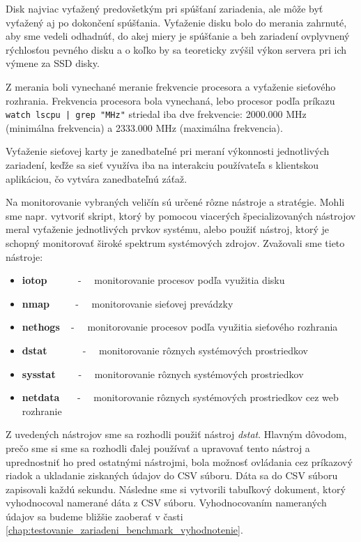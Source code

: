 Disk najviac vyťažený predovšetkým pri spúšťaní zariadenia, ale môže byť vyťažený aj po dokončení spúšťania. Vyťaženie disku bolo do merania zahrnuté, aby sme vedeli odhadnúť, do akej miery je spúšťanie a beh zariadení ovplyvnený rýchlosťou pevného disku a o koľko by sa teoreticky zvýšil výkon servera pri ich výmene za SSD disky.

Z merania boli vynechané meranie frekvencie procesora a vyťaženie sieťového rozhrania. Frekvencia procesora bola vynechaná, lebo procesor podľa príkazu \texttt{watch lscpu | grep "MHz"} striedal iba dve frekvencie: 2000.000 MHz (minimálna frekvencia) a 2333.000 MHz (maximálna frekvencia).

Vyťaženie sieťovej karty je zanedbateľné pri meraní výkonnosti jednotlivých zariadení, keďže sa sieť využíva iba na interakciu používateľa s klientskou aplikáciou, čo vytvára zanedbateľnú záťaž.

Na monitorovanie vybraných veličín sú určené rôzne nástroje a stratégie. Mohli sme napr. vytvoriť skript, ktorý by pomocou viacerých špecializovaných nástrojov meral vyťaženie jednotlivých prvkov systému, alebo použiť nástroj, ktorý je schopný monitorovať široké spektrum systémových zdrojov. Zvažovali sme tieto nástroje:

\begin{itemize}
    \item \textbf{iotop} ~~~~~ - ~~monitorovanie procesov podľa využitia disku
    \item \textbf{nmap} ~~~~ - ~~monitorovanie sieťovej prevádzky
    \item \textbf{nethogs} ~ - ~~monitorovanie procesov podľa využitia sieťového rozhrania
    \item \textbf{dstat} ~~~~~~ - ~~monitorovanie rôznych systémových prostriedkov
    \item \textbf{sysstat} ~~~~- ~~monitorovanie rôznych systémových prostriedkov
    \item \textbf{netdata} ~~~- ~~monitorovanie rôznych systémových prostriedkov cez web rozhranie
\end{itemize}

Z uvedených nástrojov sme sa rozhodli použiť nástroj \emph{dstat}. Hlavným dôvodom, prečo sme si sme sa rozhodli ďalej používať a upravovať tento nástroj a uprednostniť ho pred ostatnými nástrojmi, bola možnosť ovládania cez príkazový riadok a ukladanie ziskaných údajov do CSV súboru. Dáta sa do CSV súboru zapisovali každú sekundu. Následne sme si vytvorili tabuľkový dokument, ktorý vyhodnocoval namerané dáta z CSV súboru. Vyhodnocovaním nameraných údajov sa budeme bližšie zaoberať v časti \ref{chap:testovanie_zariadeni_benchmark_vyhodnotenie}.

